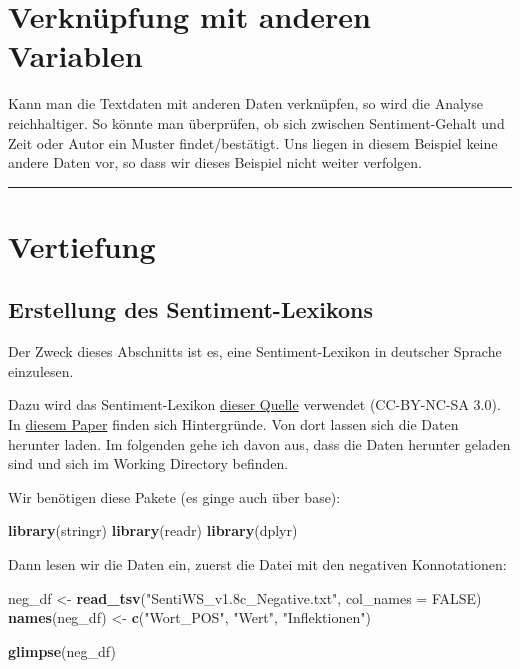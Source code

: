\documentclass[12pt,]{book}
\newenvironment{Shaded}{\begin{snugshade}}{\end{snugshade}}
\newcommand{\KeywordTok}[1]{\textcolor[rgb]{0.13,0.29,0.53}{\textbf{{#1}}}}
\newcommand{\DataTypeTok}[1]{\textcolor[rgb]{0.13,0.29,0.53}{{#1}}}
\newcommand{\StringTok}[1]{\textcolor[rgb]{0.31,0.60,0.02}{{#1}}}
\newcommand{\OtherTok}[1]{\textcolor[rgb]{0.56,0.35,0.01}{{#1}}}
\newcommand{\NormalTok}[1]{{#1}}
\begin{document}
\section{Verknüpfung mit anderen
Variablen}\label{verknupfung-mit-anderen-variablen}

Kann man die Textdaten mit anderen Daten verknüpfen, so wird die Analyse
reichhaltiger. So könnte man überprüfen, ob sich zwischen
Sentiment-Gehalt und Zeit oder Autor ein Muster findet/bestätigt. Uns
liegen in diesem Beispiel keine andere Daten vor, so dass wir dieses
Beispiel nicht weiter verfolgen.

\begin{center}\rule{0.5\linewidth}{\linethickness}\end{center}

\section{Vertiefung}\label{vertiefung}

\subsection{Erstellung des
Sentiment-Lexikons}\label{erstellung-des-sentiment-lexikons}

Der Zweck dieses Abschnitts ist es, eine Sentiment-Lexikon in deutscher
Sprache einzulesen.

Dazu wird das Sentiment-Lexikon
\href{http://asv.informatik.uni-leipzig.de/download/sentiws.html}{dieser
Quelle} verwendet (CC-BY-NC-SA 3.0). In
\href{http://asv.informatik.uni-leipzig.de/publication/file/155/490_Paper.pdf}{diesem
Paper} finden sich Hintergründe. Von dort lassen sich die Daten herunter
laden. Im folgenden gehe ich davon aus, dass die Daten herunter geladen
sind und sich im Working Directory befinden.

Wir benötigen diese Pakete (es ginge auch über base):

\begin{Shaded}
\begin{Highlighting}[]
\KeywordTok{library}\NormalTok{(stringr)}
\KeywordTok{library}\NormalTok{(readr)}
\KeywordTok{library}\NormalTok{(dplyr)}
\end{Highlighting}
\end{Shaded}

Dann lesen wir die Daten ein, zuerst die Datei mit den negativen
Konnotationen:

\begin{Shaded}
\begin{Highlighting}[]
\NormalTok{neg_df <-}\StringTok{ }\KeywordTok{read_tsv}\NormalTok{(}\StringTok{"SentiWS_v1.8c_Negative.txt"}\NormalTok{, }\DataTypeTok{col_names =} \OtherTok{FALSE}\NormalTok{)}
\KeywordTok{names}\NormalTok{(neg_df) <-}\StringTok{ }\KeywordTok{c}\NormalTok{(}\StringTok{"Wort_POS"}\NormalTok{, }\StringTok{"Wert"}\NormalTok{, }\StringTok{"Inflektionen"}\NormalTok{)}

\KeywordTok{glimpse}\NormalTok{(neg_df)}
\end{Highlighting}
\end{Shaded}
\end{document}
